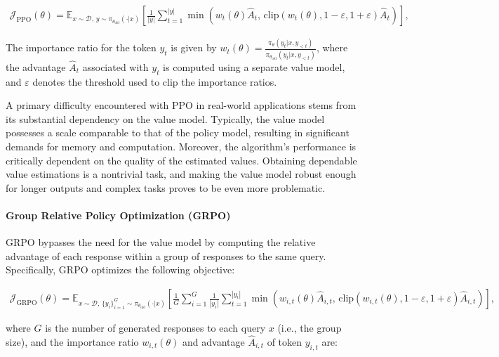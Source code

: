 \begin{align}
\mathcal{J}_\text{PPO}(\theta) = \mathbb{E}_{ x \sim \mathcal{D},\, y \sim \pi_{\theta_\text{old}}( \cdot | x) }
\left[ \frac{1}{|y|} \sum_{t=1}^{|y|} 
\min \left( w_{t}(\theta) \widehat{A}_{t},  \, \mathrm{clip} \left( w_{t}(\theta), 1 - {\varepsilon}, 1 + {\varepsilon}\right) \widehat{A}_{t} \right)
\right],
\end{align}

The importance ratio for the token $y_t$ is given by $
w_{t}(\theta) = \frac{ \pi_{\theta} (y_{t} | x, y_{<t}) }{ \pi_{\theta_\text{old}} (y_{t} | x,y_{<t})} $, where the advantage $\widehat{A}_{t}$ associated with $y_t$ is computed using a separate value model, and $\varepsilon$ denotes the threshold used to clip the importance ratios.

A primary difficulty encountered with PPO in real-world applications stems from its substantial dependency on the value model. Typically, the value model possesses a scale comparable to that of the policy model, resulting in significant demands for memory and computation. Moreover, the algorithm’s performance is critically dependent on the quality of the estimated values. Obtaining dependable value estimations is a nontrivial task, and making the value model robust enough for longer outputs and complex tasks proves to be even more problematic.

\paragraph{Group Relative Policy Optimization (GRPO)} GRPO \citep{grpo} bypasses the need for the value model by computing the relative advantage of each response within a group of responses to the same query. Specifically, GRPO optimizes the following objective:

\begin{align}
\label{equ:grpo}
\mathcal{J}_\text{GRPO}(\theta) = \mathbb{E}_{ x \sim \mathcal{D},\, \{y_i\}_{i=1}^G \sim \pi_{\theta_\text{old}}( \cdot | x) }
\left[ \frac{1}{G} \sum_{i=1}^{G} \frac{1}{|y_i|} \sum_{t=1}^{|y_i|} 
\min \left( w_{i,t}(\theta) \widehat{A}_{i,t},  \, \mathrm{clip} \left( w_{i,t}(\theta), 1 - {\varepsilon}, 1 + {\varepsilon}\right) \widehat{A}_{i,t} \right)
\right],
\end{align}

where $G$ is the number of generated responses to each query $x$ (i.e., the group size), and the importance ratio $w_{i,t}(\theta)$ and advantage $\widehat{A}_{i,t}$ of token $y_{i,t}$ are:

